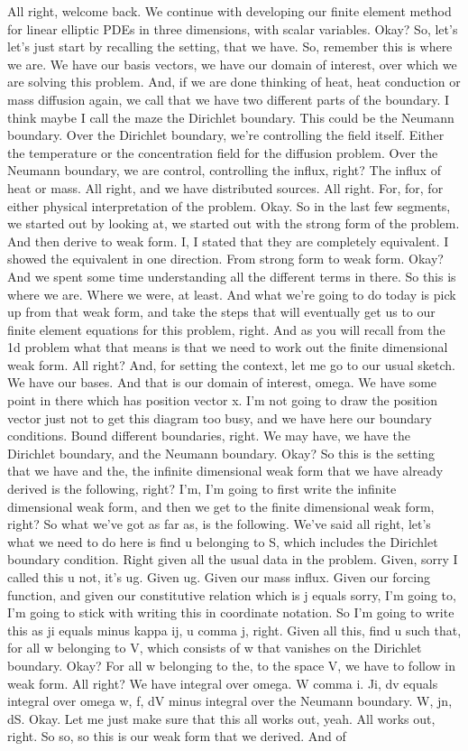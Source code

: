\documentclass[10pt]{article}
\begin{document}
All right, welcome back. We continue with developing our finite element method for linear elliptic PDEs in three dimensions, with scalar variables. Okay? So, let's let's just start by recalling the setting, that we have. So, remember this is where we are. We have our basis vectors, we have our domain of interest, over which we are solving this problem. And, if we are done thinking of heat, heat conduction or mass diffusion again, we call that we have two different parts of the boundary. I think maybe I call the maze the Dirichlet boundary. This could be the Neumann boundary. Over the Dirichlet boundary, we're controlling the field itself. Either the temperature or the concentration field for the diffusion problem. Over the Neumann boundary, we are control, controlling the influx, right? The influx of heat or mass. All right, and we have distributed sources. All right. For, for, for either physical interpretation of the problem. Okay. So in the last few segments, we started out by looking at, we started out with the strong form of the problem. And then derive to weak form. I, I stated that they are completely equivalent. I showed the equivalent in one direction. From strong form to weak form. Okay? And we spent some time understanding all the different terms in there. So this is where we are. Where we were, at least. And what we're going to do today is pick up from that weak form, and take the steps that will eventually get us to our finite element equations for this problem, right. And as you will recall from the 1d problem what that means is that we need to work out the finite dimensional weak form. All right? And, for setting the context, let me go to our usual sketch. We have our bases. And that is our domain of interest, omega. We have some point in there which has position vector x. I'm not going to draw the position vector just not to get this diagram too busy, and we have here our boundary conditions. Bound different boundaries, right. We may have, we have the Dirichlet boundary, and the Neumann boundary. Okay? So this is the setting that we have and the, the infinite dimensional weak form that we have already derived is the following, right? I'm, I'm going to first write the infinite dimensional weak form, and then we get to the finite dimensional weak form, right? So what we've got as far as, is the following. We've said all right, let's what we need to do here is find u belonging to S, which includes the Dirichlet boundary condition. Right given all the usual data in the problem. Given, sorry I called this u not, it's ug. Given ug. Given our mass influx. Given our forcing function, and given our constitutive relation which is j equals sorry, I'm going to, I'm going to stick with writing this in coordinate notation. So I'm going to write this as ji equals minus kappa ij, u comma j, right. Given all this, find u such that, for all w belonging to V, which consists of w that vanishes on the Dirichlet boundary. Okay? For all w belonging to the, to the space V, we have to follow in weak form. All right? We have integral over omega. W comma i. Ji, dv equals integral over omega w, f, dV minus integral over the Neumann boundary. W, jn, dS. Okay. Let me just make sure that this all works out, yeah. All works out, right. So so, so this is our weak form that we derived. And of 
\end{document}
